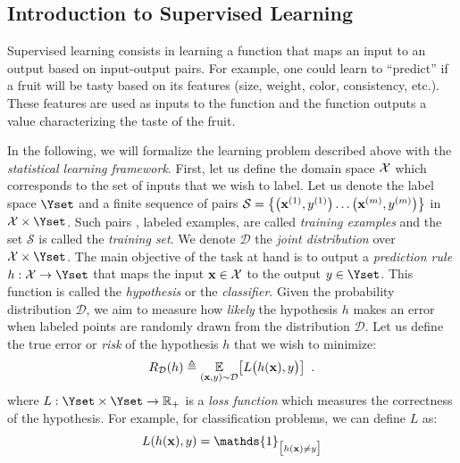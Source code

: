 \subsection{Introduction to Supervised Learning}
\label{subsection:ch2-introduction_on_supervised_learning}

Supervised learning consists in learning a function that maps an input to an output based on input-output pairs.
For example, one could learn to ``predict'' if a fruit will be tasty based on its features (\eg size, weight, color, consistency, etc.).
These features are used as inputs to the function and the function outputs a value characterizing the taste of the fruit. 

In the following, we will formalize the learning problem described above with the \emph{statistical learning framework}.
First, let us define the domain space $\mathcal{X}$ which corresponds to the set of inputs that we wish to label.
Let us denote the label space $\Yset$ and a finite sequence of pairs $\mathcal{S} = \left\{ \left(\xvec^{(1)}, y^{(1)} \right) \dots \left( \xvec^{(m)}, y^{(m)} \right) \right\}$ in $\Xset \times \Yset$. 
Such pairs \ie, labeled examples, are called \emph{training examples} and the set $\mathcal{S}$ is called the \emph{training set}.
We denote $\mathcal{D}$ the \emph{joint distribution} over $\Xset \times \Yset$.
The main objective of the task at hand is to output a \emph{prediction rule} $h: \Xset \rightarrow \Yset$ that maps the input $\mathbf{x} \in \mathcal{X}$ to the output $y \in \Yset$.
This function is called the \emph{hypothesis} or the \emph{classifier}. 
Given the probability distribution $\mathcal{D}$, we aim to measure how \emph{likely} the hypothesis $h$ makes an error when labeled points are randomly drawn from the distribution $\mathcal{D}$.
Let us define the true error or \emph{risk} of the hypothesis $h$ that we wish to minimize:
\begin{equation} \label{equation:ch2-risk2}
  R_{\mathcal{D}}(h) \triangleq \Ebb_{(\xvec, y) \sim \mathcal{D}} \left[ L\big( h(\xvec), y \big) \right] \enspace.
\end{equation}
where $L: \Yset \times \Yset \rightarrow \Rbb_{+}$ is a \emph{loss function} which measures the correctness of the hypothesis.
For example, for classification problems, we can define $L$ as: %
\begin{equation}
  L(h(\xvec), y) = \mathds{1}_{\big[ h(\xvec) \neq y \big]}
\end{equation}

